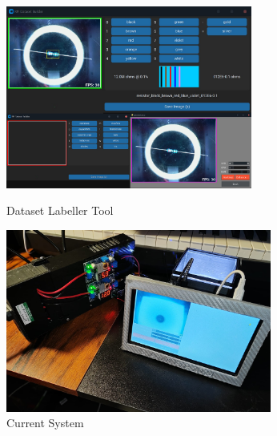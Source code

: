 \begin{figure}
  \begin{minipage}[t]{0.49\textwidth}
      \centering
      \includegraphics[width=\textwidth,height=6cm,keepaspectratio]{imgs/software/tools.png}
      \caption{Dataset Labeller Tool}
      \label{fig:customtool}
  \end{minipage}
  \hfill
  \begin{minipage}[t]{0.49\textwidth}
    \centering
    \includegraphics[width=\textwidth,height=6cm,keepaspectratio]{imgs/design/allparts.jpeg}
    \caption{Current System}
    \label{fig:allparts}
\end{minipage}
\hfill
\end{figure}
